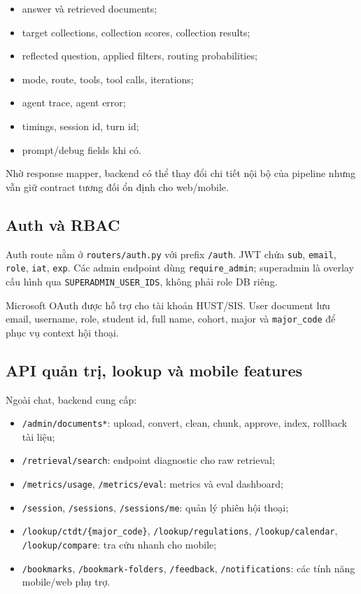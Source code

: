 \documentclass[../DoAn.tex]{subfiles}
\begin{document}
\begin{itemize}
    \item answer và retrieved documents;
    \item target collections, collection scores, collection results;
    \item reflected question, applied filters, routing probabilities;
    \item mode, route, tools, tool calls, iterations;
    \item agent trace, agent error;
    \item timings, session id, turn id;
    \item prompt/debug fields khi có.
\end{itemize}

Nhờ response mapper, backend có thể thay đổi chi tiết nội bộ của pipeline nhưng
vẫn giữ contract tương đối ổn định cho web/mobile.

\subsection{Auth và RBAC}

Auth route nằm ở \texttt{routers/auth.py} với prefix \texttt{/auth}. JWT chứa
\texttt{sub}, \texttt{email}, \texttt{role}, \texttt{iat}, \texttt{exp}. Các
admin endpoint dùng \texttt{require\_admin}; superadmin là overlay cấu hình qua
\texttt{SUPERADMIN\_USER\_IDS}, không phải role DB riêng.

Microsoft OAuth được hỗ trợ cho tài khoản HUST/SIS. User document lưu email,
username, role, student id, full name, cohort, major và \texttt{major\_code} để
phục vụ context hội thoại.

\subsection{API quản trị, lookup và mobile features}

Ngoài chat, backend cung cấp:

\begin{itemize}
    \item \texttt{/admin/documents*}: upload, convert, clean, chunk, approve,
    index, rollback tài liệu;
    \item \texttt{/retrieval/search}: endpoint diagnostic cho raw retrieval;
    \item \texttt{/metrics/usage}, \texttt{/metrics/eval}: metrics và eval
    dashboard;
    \item \texttt{/session}, \texttt{/sessions}, \texttt{/sessions/me}: quản lý
    phiên hội thoại;
    \item \texttt{/lookup/ctdt/\{major\_code\}},
    \texttt{/lookup/regulations}, \texttt{/lookup/calendar},
    \texttt{/lookup/compare}: tra cứu nhanh cho mobile;
    \item \texttt{/bookmarks}, \texttt{/bookmark-folders}, \texttt{/feedback},
    \texttt{/notifications}: các tính năng mobile/web phụ trợ.
\end{itemize}
\end{document}

